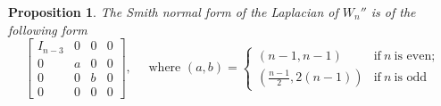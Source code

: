\documentclass[11pt,reqno]{amsart}
\theoremstyle{definition}
\theoremstyle{plain}
\newtheorem{proposition}[mydef]{Proposition}
\begin{document}
\begin{proposition}\label{proposition: wheel2}
The Smith normal form of the Laplacian of $W_n''$ is of the following form 
\begin{equation*}
\left[
\begin{array}{c|ccc}	
I_{n-3} & 0 & 0 & 0 \\
\hline
0 & a & 0 & 0 \\
0 & 0 & b & 0 \\
0 & 0 & 0 & 0 
\end{array}
\right], \quad \textrm{ where } (a,b) = \begin{cases}
(n-1,n-1) & \text{if}~ n ~\text{is even}; \\
(\frac{n-1}2, 2(n-1)) & \text{if}~ n ~\text{is odd}
\end{cases}
\end{equation*}
\end{proposition}
\end{document}

